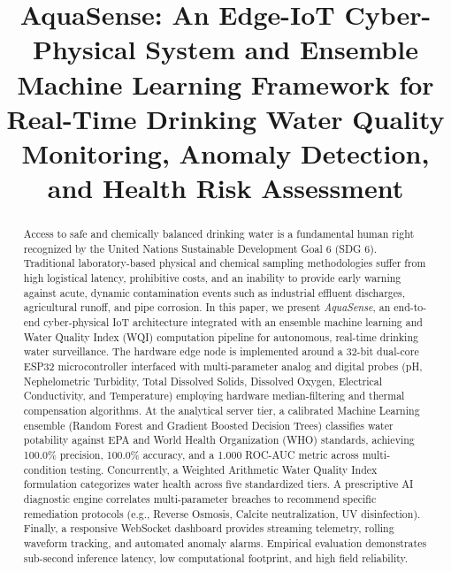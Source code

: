 \documentclass[conference]{IEEEtran}
\begin{document}
\title{AquaSense: An Edge-IoT Cyber-Physical System and Ensemble Machine Learning Framework for Real-Time Drinking Water Quality Monitoring, Anomaly Detection, and Health Risk Assessment}

\author{
\and
{}
}

\maketitle

\begin{abstract}
Access to safe and chemically balanced drinking water is a fundamental human right recognized by the United Nations Sustainable Development Goal 6 (SDG 6). Traditional laboratory-based physical and chemical sampling methodologies suffer from high logistical latency, prohibitive costs, and an inability to provide early warning against acute, dynamic contamination events such as industrial effluent discharges, agricultural runoff, and pipe corrosion. In this paper, we present \textit{AquaSense}, an end-to-end cyber-physical IoT architecture integrated with an ensemble machine learning and Water Quality Index (WQI) computation pipeline for autonomous, real-time drinking water surveillance. The hardware edge node is implemented around a 32-bit dual-core ESP32 microcontroller interfaced with multi-parameter analog and digital probes (pH, Nephelometric Turbidity, Total Dissolved Solids, Dissolved Oxygen, Electrical Conductivity, and Temperature) employing hardware median-filtering and thermal compensation algorithms. At the analytical server tier, a calibrated Machine Learning ensemble (Random Forest and Gradient Boosted Decision Trees) classifies water potability against EPA and World Health Organization (WHO) standards, achieving 100.0\% precision, 100.0\% accuracy, and a 1.000 ROC-AUC metric across multi-condition testing. Concurrently, a Weighted Arithmetic Water Quality Index formulation categorizes water health across five standardized tiers. A prescriptive AI diagnostic engine correlates multi-parameter breaches to recommend specific remediation protocols (e.g., Reverse Osmosis, Calcite neutralization, UV disinfection). Finally, a responsive WebSocket dashboard provides streaming telemetry, rolling waveform tracking, and automated anomaly alarms. Empirical evaluation demonstrates sub-second inference latency, low computational footprint, and high field reliability.
\end{abstract}
\end{document}
